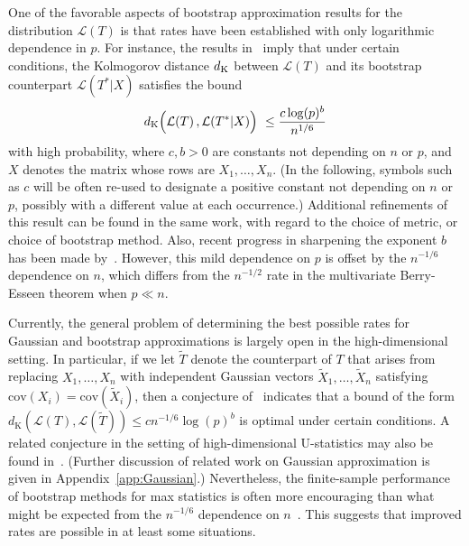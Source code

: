 \documentclass[aos,preprint]{imsart}
\numberwithin{equation}{section}
\theoremstyle{plain}
\newcommand{\dK}{d_{\textup{K}}}
\renewcommand{\L}{\mathcal{L}}
\newcommand{\1}{{\bf{1}}}
\newcommand{\0}{\mathbf{0}}
\begin{document}
One of the favorable aspects of bootstrap approximation results for the distribution $\mathcal{L}(T)$ is that rates have been established with only logarithmic dependence in $p$. For instance, the results in~\cite{CCK:AOP} imply that under certain conditions, the Kolmogorov distance $\dK$ between $\mathcal{L}(T)$ and its bootstrap counterpart $\mathcal{L}(T^*|X)$ satisfies the bound
\begin{equation}\label{eqn:introrate}
\dK\Big( \L(T) \, , \L(T^*|X)\Big) \ \leq  \frac{c \log(p)^{b}}{n^{1/6}}
\end{equation}
with high probability, where $c,b>0$ are constants not depending on $n$ or $p$, and $X$ denotes the matrix whose rows are $X_1,\dots,X_n$. (In the following, symbols such as $c$ will be often re-used to designate a positive constant not depending on $n$ or $p$, possibly with a different value at each occurrence.) Additional refinements of this result can be found in the same work, with regard to the choice of metric, or choice of bootstrap method. Also, recent progress in sharpening the exponent $b$ has been made by~\cite{Deng:2017}. However, this mild dependence on $p$ is offset by the $n^{-1/6}$ dependence on $n$, which differs from the $n^{-1/2}$ rate in the multivariate Berry-Esseen theorem when $p\ll n$.

Currently, the general problem of determining the best possible rates for Gaussian and bootstrap approximations is largely open in the high-dimensional setting. In particular, if we let $\tilde T$ denote the counterpart of $T$ that arises from replacing $X_1,\dots,X_n$ with independent Gaussian vectors \mbox{$\tilde X_1,\dots,\tilde X_n$} satisfying $\text{cov}(X_i)=\text{cov}(\tilde X_i)$, then a conjecture of~\cite{CCK:AOP} indicates that a bound of the form $d_{\text{K}}(\L(T),\L(\tilde T))\leq cn^{-1/6}\log(p)^b$ is optimal under certain conditions. A related conjecture in the setting of high-dimensional U-statistics may also be found in~\cite{ChenUstat:2018}. (Further discussion of related work on Gaussian approximation is given in Appendix~\ref{app:Gaussian}.)
Nevertheless, the finite-sample performance of bootstrap methods for max statistics is often more encouraging than what might be expected from the $n^{-1/6}$ dependence on $n$~\cite[see, e.g.][]{ChengJASA:2017, fan:18,Belloni:2018}. This suggests that improved rates are possible in at least some situations. 
\end{document}
